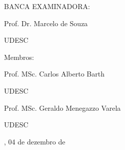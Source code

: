 

%
% 
%
\begin{folhadeaprovacao}



	\begin{center}
		{\selectfont\MakeTextUppercase{\normalsize\imprimirautor}}
	\end{center}
	\vfill

	\vfill
	\begin{center}
		{\selectfont\MakeTextUppercase{\imprimirtitulo}}
	\end{center}
	\vfill




	\vfill

	\begin{center}

		{\selectfont BANCA EXAMINADORA: }
		\vspace*{1.75cm}

		Prof. Dr. Marcelo de Souza \par
		UDESC
	\end{center}

	{Membros:}

	\begin{center}
		\vspace*{1.25cm}
		Prof. MSc. Carlos Alberto Barth \par
		UDESC

		\vspace*{1.25cm}
		Prof. MSc. Geraldo Menegazzo Varela \par
		UDESC
	\end{center}

	\vspace*{\fill}
	\begin{center}
		{\imprimirlocal, 04 de dezembro de \imprimirdata}
	\end{center}
	\vspace*{0.25cm}
\end{folhadeaprovacao}




